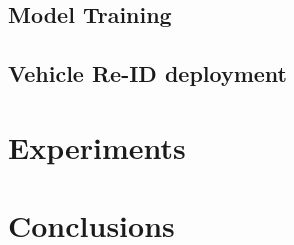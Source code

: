 \documentclass[10pt,twocolumn,letterpaper]{article}
\begin{document}
\subsection{Model Training}



\subsection{Vehicle Re-ID deployment}

\section{Experiments}

\section{Conclusions}

{\small


}
\end{document}
